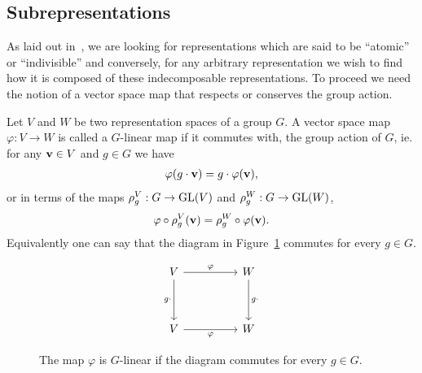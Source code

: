 \subsection{Subrepresentations}\label{sect:subrepr}

As laid out in~\cite[Sect.1.2.]{FultonHarris}, we are looking for representations which are said to be ``atomic'' or ``indivisible'' and conversely, for any arbitrary representation we wish to find how it is composed of these indecomposable representations. To proceed we need the notion of a vector space map that respects or conserves the group action.	

\begin{definition}\cite[Sect.1.1.]{FultonHarris}
	Let $V$ and $W$ be two representation spaces of a group $G$. A vector space map 
		$\varphi: V \rightarrow W$
	is called a $G$-linear map if it commutes with, the group action of $G$, ie. for any $\mathbf{v} \in V$ and $g \in G$ we have
	\begin{align*}
		\varphi( g \cdot \mathbf{v} ) = g \cdot \varphi (\mathbf{v}),
	\end{align*}
	or in terms of the maps $\rho_g^V: G \rightarrow \text{GL}(V)$ and $\rho_g^W: G \rightarrow \text{GL}(W)$,
	\begin{align*}
		\varphi \circ \rho^V_g (\mathbf{v}) = \rho^W_g \circ \varphi (\mathbf{v}).
	\end{align*}
	Equivalently one can say that the diagram in Figure~\ref*{fig:commapmorp} commutes for every $g \in G$.
	\begin{figure}[hbt!]
		\centering
		\[\begin{tikzcd}
			V && W \\
			\\
			V && W
			\arrow["\varphi", from=1-1, to=1-3]
			\arrow["g\cdot"', from=1-1, to=3-1]
			\arrow["g\cdot", from=1-3, to=3-3]
			\arrow["\varphi"', from=3-1, to=3-3]
		\end{tikzcd}\]
		\caption{The map $\varphi$ is $G$-linear if the diagram commutes for every $g \in G$.}
		\label{fig:commapmorp}
	\end{figure}
\end{definition}

